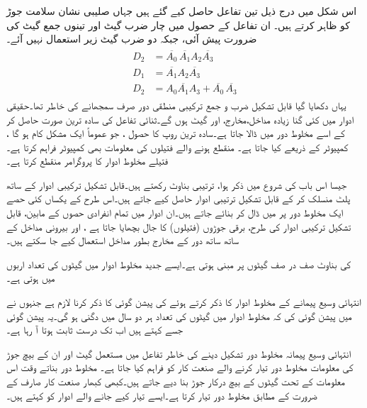 اس شکل میں درج ذیل تین تفاعل حاصل کیے گئے ہیں جہاں صلیبی نشان سلامت جوڑ کو ظاہر کرتے ہیں۔ ان تفاعل کے حصول میں چار ضرب گیٹ اور تینوں جمع گیٹ کی ضرورت پیش آئی، جبکہ دو ضرب گیٹ زیر استعمال نہیں آئے۔
\begin{gather}
\begin{aligned}
D_2&=\overline{A_0}\,\overline{A_1} A_2 \overline{A_3}\\
D_1&=\overline{A_1}A_2 \overline{A_3}\\
D_2&=A_0\overline{A_1}A_3+\overline{A_0}\,\overline{A_3}
\end{aligned}
\end{gather}
 یہاں دکھایا گیا قابل تشکیل ضرب و جمع ترکیبی منطقی دور صرف سمجھانے کی خاطر تھا۔حقیقی ادوار میں کئی گنا زیادہ مداخل،مخارج، اور گیٹ ہوں گے۔ثنائی تفاعل کی سادہ ترین صورت حاصل کر کے اسے مخلوط دور میں ڈالا جاتا ہے۔سادہ ترین روپ کا حصول ، جو عموماً ایک مشکل کام ہو گا ، کمپیوٹر کے ذریعے کیا جاتا ہے۔ منقطع ہونے والے فتیلوں کی معلومات بھی کمپیوٹر فراہم کرتا ہے۔فتیلے مخلوط ادوار کا پروگرامر منقطع کرتا ہے۔


جیسا اس باب کی شروع میں ذکر ہوا،  ترتیبی بناوٹ رکھتے ہیں۔قابل تشکیل ترکیبی ادوار کے ساتھ پلٹ منسلک کر کے قابل تشکیل ترتیبی ادوار حاصل کیے جاتے ہیں۔اس طرح کے یکساں کئی حصے ایک مخلوط دور پر میں ڈال کر  بنائے جاتے ہیں۔ان ادوار میں تمام انفرادی حصوں کے مابین، قابل تشکیل ترکیبی ادوار کی طرح، برقی جوڑوں (فتیلوں) کا جال بچھایا جاتا ہے ، اور بیرونی مداخل کے ساتھ ساتھ دور کے مخارج بطور مداخل استعمال کیے جا سکتے ہیں۔

 کی بناوٹ صف در صف گیٹوں پر مبنی ہوتی ہے۔ایسے جدید مخلوط ادوار میں گیٹوں کی تعداد اربوں میں ہوتی ہے۔

انتہائی وسیع پیمانے کے مخلوط ادوار کا ذکر کرتے ہوئے  کی پیشن گوئی کا ذکر کرنا لازم ہے جنہوں نے  میں پیشن گوئی کی کہ مخلوط ادوار میں گیٹوں کی تعداد ہر دو سال میں دگنی ہو گی۔یہ پیشن گوئی جسے  کہتے ہیں اب تک درست ثابت ہوتا آ رہا ہے۔

انتہائی وسیع پیمانہ مخلوط دور تشکیل دینے کی خاطر تفاعل میں مستعمل گیٹ اور ان کے بیچ جوڑ کی معلومات مخلوط دور تیار کرنے والے صنعت کار کو فراہم کیا جاتا ہے۔ مخلوط دور بناتے وقت اس معلومات کے تحت گیٹوں کے بیچ درکار جوڑ بنا دیے جاتے ہیں۔کبھی کبھار صنعت کار صارف کے ضرورت کے مطابق مخلوط دور تیار کرتا ہے۔ایسے تیار کیے جانے والے ادوار کو کہتے ہیں۔

